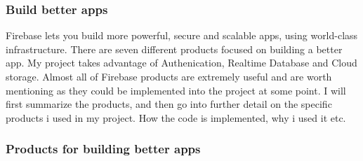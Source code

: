 \subsubsection{Build better apps} Firebase lets you build more powerful, secure and scalable apps, using world-class infrastructure. There are seven different products focused on building a better app. My project takes advantage of Authenication, Realtime Database and Cloud storage. Almost all of Firebase products are extremely useful and are worth mentioning as they could be implemented into the project at some point.
I will first summarize the products, and then go into further detail on the specific products i used in my project. How the code is implemented, why i used it etc.

\newpage
\subsubsection{Products for building better apps}
